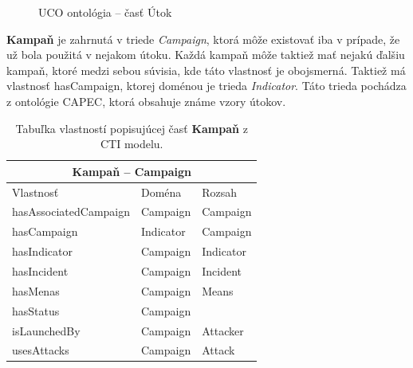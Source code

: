 \documentclass[12pt, a4paper, oneside]{book}
\begin{document}
\begin{figure}[!hb]
\label{fig:ucoUtok}
\caption{UCO ontológia -- časť Útok}
\end{figure}

\textbf{Kampaň} je zahrnutá v triede \textit{Campaign}, ktorá môže existovať iba v prípade, že už bola použitá v nejakom útoku. Každá kampaň môže taktiež mať nejakú ďalšiu kampaň, ktoré medzi sebou súvisia, kde táto vlastnosť je obojsmerná. Taktiež má vlastnosť hasCampaign, ktorej doménou je trieda \textit{Indicator}. Táto trieda pochádza z ontológie CAPEC, ktorá obsahuje známe vzory útokov.
\begin{table}[hbt!]
\centering
\begin{tabular}{ |p{5cm}||p{3cm}|p{3cm}|  }
 \hline
 \multicolumn{3}{|c|}{Kampaň -- Campaign} \\
 \hline
 Vlastnosť & Doména & Rozsah\\
 \hline
 hasAssociatedCampaign & Campaign & Campaign\\
 hasCampaign & Indicator & Campaign\\
 hasIndicator & Campaign & Indicator\\
 hasIncident & Campaign & Incident\\
 hasMenas & Campaign & Means\\
 hasStatus & Campaign & \\
 isLaunchedBy & Campaign & Attacker\\
 usesAttacks & Campaign & Attack\\
 \hline
\end{tabular}
\caption{Tabuľka vlastností popisujúcej časť \textbf{Kampaň} z CTI modelu.}
\label{tab:template}
\end{table}
\end{document}
